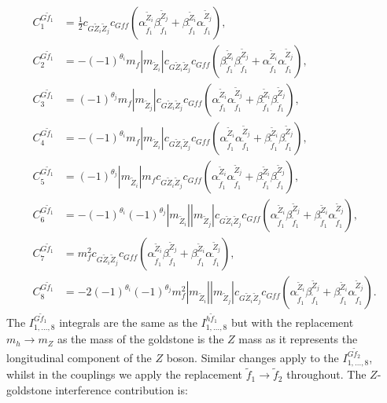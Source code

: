 \documentclass[final,3p,times]{elsarticle}
\begin{document}
\begin{align}
C_{1}^{G \tilde{f}_1} &= \frac{1}{2} c_{G \tilde{Z}_i \tilde{Z}_j} c_{G f f}({\alpha_{\tilde{f}_1}^{\tilde{Z}_i}}{\beta_{\tilde{f}_1}^{\tilde{Z}_j}} + {\beta_{\tilde{f}_1}^{\tilde{Z}_i}}{\alpha_{\tilde{f}_1}^{\tilde{Z}_j}}), \\
C_{2}^{G \tilde{f}_1} &= -(-1)^{\theta_i}m_{f}|m_{\tilde{Z}_i}| c_{G \tilde{Z}_i \tilde{Z}_j} c_{G f f}({\beta_{\tilde{f}_1}^{\tilde{Z}_i}}{\beta_{\tilde{f}_1}^{\tilde{Z}_j}} + {\alpha_{\tilde{f}_1}^{\tilde{Z}_i}}{\alpha_{\tilde{f}_1}^{\tilde{Z}_j}}), \\
C_{3}^{G \tilde{f}_1} &= (-1)^{\theta_j}m_{f}|m_{\tilde{Z}_j}| c_{G \tilde{Z}_i \tilde{Z}_j} c_{G f f}({\alpha_{\tilde{f}_1}^{\tilde{Z}_i}}{\alpha_{\tilde{f}_1}^{\tilde{Z}_j}} + {\beta_{\tilde{f}_1}^{\tilde{Z}_i}}{\beta_{\tilde{f}_1}^{\tilde{Z}_j}}), \\
C_{4}^{G \tilde{f}_1} &= -(-1)^{\theta_i}m_{f}|m_{\tilde{Z}_i}| c_{G \tilde{Z}_i \tilde{Z}_j} c_{G f f}({\alpha_{\tilde{f}_1}^{\tilde{Z}_i}}{\alpha_{\tilde{f}_1}^{\tilde{Z}_j}} + {\beta_{\tilde{f}_1}^{\tilde{Z}_i}}{\beta_{\tilde{f}_1}^{\tilde{Z}_j}}), \\
C_{5}^{G \tilde{f}_1} &= (-1)^{\theta_j}|m_{\tilde{Z}_i}|m_{f} c_{G \tilde{Z}_i \tilde{Z}_j} c_{G f f}({\alpha_{\tilde{f}_1}^{\tilde{Z}_i}}{\alpha_{\tilde{f}_1}^{\tilde{Z}_j}} + {\beta_{\tilde{f}_1}^{\tilde{Z}_i}}{\beta_{\tilde{f}_1}^{\tilde{Z}_j}}),  \\
C_{6}^{G \tilde{f}_1} &= -(-1)^{\theta_i}(-1)^{\theta_j}|m_{\tilde{Z}_i}||m_{\tilde{Z}_j}| c_{G \tilde{Z}_i \tilde{Z}_j} c_{G f f}({\alpha_{\tilde{f}_1}^{\tilde{Z}_i}}{\beta_{\tilde{f}_1}^{\tilde{Z}_j}} + {\beta_{\tilde{f}_1}^{\tilde{Z}_i}}{\alpha_{\tilde{f}_1}^{\tilde{Z}_j}}),  \\
C_{7}^{G \tilde{f}_1} &= m_{f}^2 c_{G \tilde{Z}_i \tilde{Z}_j} c_{G f f}({\alpha_{\tilde{f}_1}^{\tilde{Z}_i}}{\beta_{\tilde{f}_1}^{\tilde{Z}_j}} + {\beta_{\tilde{f}_1}^{\tilde{Z}_i}}{\alpha_{\tilde{f}_1}^{\tilde{Z}_j}}),  \\
C_{8}^{G \tilde{f}_1} &= -2(-1)^{\theta_i}(-1)^{\theta_j}m_{f}^2|m_{\tilde{Z}_i}||m_{\tilde{Z}_j}| c_{G \tilde{Z}_i \tilde{Z}_j} c_{G f f}({\alpha_{\tilde{f}_1}^{\tilde{Z}_i}}{\beta_{\tilde{f}_1}^{\tilde{Z}_j}} + {\beta_{\tilde{f}_1}^{\tilde{Z}_i}}{\alpha_{\tilde{f}_1}^{\tilde{Z}_j}}).  
\end{align}
The $I_{1,\ldots, 8}^{G \tilde{f}_1}$ integrals are the same as the $I_{1,\ldots,8}^{h \tilde{f}_1}$ but with the replacement $m_{h} \rightarrow m_{Z}$ as the mass of the goldstone is the $Z$ mass as it represents the longitudinal component of the $Z$ boson. Similar changes apply to the $I_{1,\ldots,8}^{G \tilde{f}_2}$, whilst in the couplings we apply the replacement $\tilde{f}_1 \rightarrow \tilde{f}_2$ throughout. The $Z$-goldstone interference contribution is:
\end{document}
